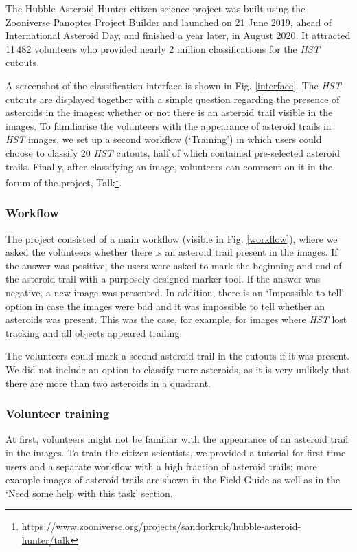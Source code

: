 \documentclass{aa}
\begin{document}
The Hubble Asteroid Hunter citizen science project was built using the Zooniverse Panoptes Project Builder and launched on 21 June 2019, ahead of International Asteroid Day, and finished a year later, in August 2020. It attracted 11\,482 volunteers who provided nearly 2 million classifications for the \textit{HST} cutouts. 

A screenshot of the classification interface is shown in Fig. \ref{interface}. The \textit{HST} cutouts are displayed together with a simple question regarding the presence of asteroids in the images: whether or not there is an asteroid trail visible in the images. To familiarise the volunteers with the appearance of asteroid trails in \textit{HST} images, we set up a second workflow (`Training') in which users could choose to classify 20 \textit{HST} cutouts, half of which contained pre-selected asteroid trails. Finally, after classifying an image, volunteers can comment on it in the forum of the project, Talk\footnote{\url{https://www.zooniverse.org/projects/sandorkruk/hubble-asteroid-hunter/talk}}.

\subsubsection{Workflow}

The project consisted of a main workflow (visible in Fig. \ref{workflow}), where we asked the volunteers whether there is an asteroid trail present in the images. If the answer was positive, the users were asked to mark the beginning and end of the asteroid trail with a purposely designed marker tool. If the answer was negative, a new image was presented. In addition, there is an `Impossible to tell' option in case the images were bad and it was impossible to tell whether an asteroids was present. This was the case, for example, for images where \textit{HST} lost tracking and all objects appeared trailing.

The volunteers could mark a second asteroid trail in the cutouts if it was present. We did not include an option to classify more asteroids, as it is very unlikely that there are more than two asteroids in a quadrant. 

\subsubsection{Volunteer training}

At first, volunteers might not be familiar with the appearance of an asteroid trail in the images. To train the citizen scientists, we provided a tutorial for first time users and a separate workflow with a high fraction of asteroid trails; more example images of asteroid trails are shown in the Field Guide as well as in the `Need some help with this task' section. 
\end{document}
